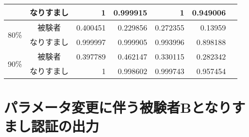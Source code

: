 \begin{center}
\begin{longtable}[btph]{|c|c|r|r|r|r|r|}
           & なりすまし & 1 & 0.999915 & 1 & 0.949006 & \\ \hline
      \multirow{2}{*}{80\%} & 被験者 & 0.400451  & 0.229856  & 0.272355  & 0.13959   & \\ \cline{2-7}
           & なりすまし & 0.999997 & 0.999905 & 0.993996 & 0.898188 & \\ \hline
      \multirow{2}{*}{90\%} & 被験者 & 0.397789  & 0.462147  & 0.330115  & 0.282342  & \\ \cline{2-7}
           & なりすまし & 1 & 0.998602 & 0.999743 & 0.957454 & \\ \hline
  \end{longtable}
\end{center}

\section{パラメータ変更に伴う被験者Bとなりすまし認証の出力\label{tune-b}}
